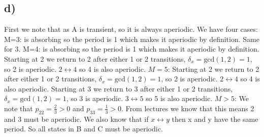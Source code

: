 \documentclass{article}
\begin{document}
\subsection*{d)}
First we note that as A is transient, so it is always aperiodic.
\newline\newline
We have four cases:
\newline
M=3:
 is absorbing so the period is 1 which makes it aperiodic by definition. Same for 3.
\newline
M=4:
 is absorbing so the period is 1 which makes it aperiodic by definition. Starting at 2 we return to 2 after either 1 or 2 transitions, $\delta_x=\text{gcd}(1,2)=1$, so 2 is aperiodic. $2\leftrightarrow4$ so 4 is also aperiodic.
\newline
$M=5$:
\newline
Starting at 2 we return to 2 after either 1 or 2 transitions, $\delta_x=\text{gcd}(1,2)=1$, so 2 is aperiodic. $2\leftrightarrow4$ so 4 is also aperiodic. Starting at 3 we return to 3 after either 1 or 2 transitions, $\delta_x=\text{gcd}(1,2)=1$, so 3 is aperiodic. $3\leftrightarrow5$ so 5 is also aperiodic.
\newline
$M>5$:
\newline
We note that $p_{22}=\frac{2}{3}>0$ and $p_{33}=\frac{1}{3}>0$. From lectures we know that this means 2 and 3 must be aperiodic. We also know that if $x\leftrightarrow y$ then x and y have the same period. So all states in B and C must be aperiodic.
\end{document}
